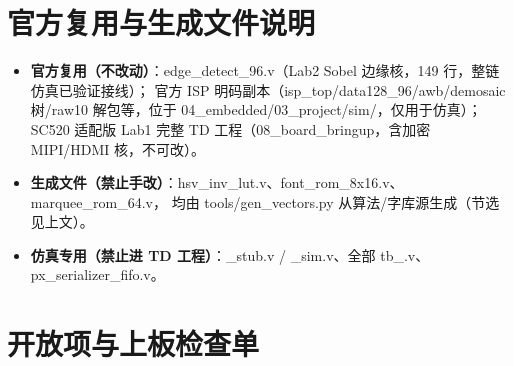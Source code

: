 \documentclass[10pt]{ctexart}
\begin{document}
\section{官方复用与生成文件说明}

\begin{itemize}
  \item \textbf{官方复用（不改动）}：edge\_detect\_96.v（Lab2 Sobel 边缘核，149 行，整链仿真已验证接线）；
        官方 ISP 明码副本（isp\_top/data128\_96/awb/demosaic 树/raw10 解包等，位于 04\_embedded/03\_project/sim/，仅用于仿真）；
        SC520 适配版 Lab1 完整 TD 工程（08\_board\_bringup，含加密 MIPI/HDMI 核，不可改）。
  \item \textbf{生成文件（禁止手改）}：hsv\_inv\_lut.v、font\_rom\_8x16.v、marquee\_rom\_64.v，
        均由 tools/gen\_vectors.py 从算法/字库源生成（节选见上文）。
  \item \textbf{仿真专用（禁止进 TD 工程）}：\*\_stub.v / \*\_sim.v、全部 tb\_\*.v、px\_serializer\_fifo.v。
\end{itemize}

\section{开放项与上板检查单}
\end{document}
